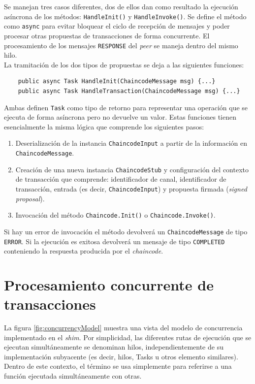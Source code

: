 Se manejan tres casos diferentes, dos de ellos dan como resultado la ejecución asíncrona de los métodos: \texttt{HandleInit()} y \texttt{HandleInvoke()}. Se define el método como \texttt{async} para evitar bloquear el ciclo de recepción de mensajes y poder procesar otras propuestas de transacciones de forma concurrente.
El procesamiento de los mensajes \texttt{RESPONSE} del \textit{peer} se maneja dentro del mismo hilo.\\

La tramitación de los dos tipos de propuestas se deja a las siguientes funciones:\\

\begin{lstlisting}
	public async Task HandleInit(ChaincodeMessage msg) {...}
	public async Task HandleTransaction(ChaincodeMessage msg) {...}
\end{lstlisting}

Ambas definen \texttt{Task} como tipo de retorno  para representar una operación que se ejecuta de forma asíncrona pero no devuelve un valor. Estas funciones tienen esencialmente la misma lógica que comprende los siguientes pasos:

\begin{enumerate}
\item Deserialización de la instancia \texttt{ChaincodeInput} a partir de la información en \texttt{ChaincodeMessage}.

\item Creación de una nueva instancia \texttt{ChaincodeStub} y configuración del contexto de transacción que comprende: identificador de canal, identificador de transacción, entrada (es decir, \texttt{ChaincodeInput}) y propuesta firmada (\textit{signed proposal}).

\item Invocación del método \texttt{Chaincode.Init()} o \texttt{Chaincode.Invoke()}.
\end{enumerate}

Si hay un error de invocación el método devolverá un \texttt{ChaincodeMessage} de tipo \texttt{ERROR}. Si la ejecución es exitosa devolverá un mensaje de tipo \texttt{COMPLETED} conteniendo la respuesta producida por el \textit{chaincode}.



\section{Procesamiento concurrente de transacciones}\label{concurrencymodel}
La figura \ref{fig:concurrencyModel} muestra una vista del modelo de concurrencia implementado en el \textit{shim}. Por simplicidad, las diferentes rutas de ejecución que se ejecutan simultáneamente se denominan hilos, independientemente de su implementación subyacente (es decir, hilos, Tasks u otros elemento similares). Dentro de este contexto, el término se usa simplemente para referirse a una función ejecutada simultáneamente con otras.

